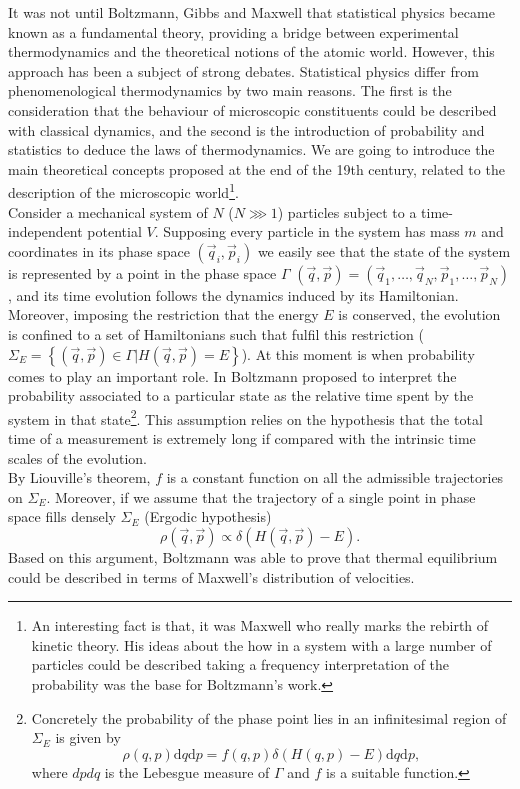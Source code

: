\indent It was not until Boltzmann, Gibbs and Maxwell that statistical physics became known as a fundamental theory, providing a bridge between experimental thermodynamics and the theoretical notions of the atomic world. However, this approach has been a subject of strong debates. Statistical physics differ from phenomenological thermodynamics by two main reasons. The first is the consideration that the behaviour of microscopic constituents could be described with classical dynamics, and the second is the introduction of probability and statistics to deduce the laws of thermodynamics. We are going to introduce the main theoretical concepts proposed at the end of the 19th century,  related to the description of the microscopic world\footnote{An interesting fact is that, it was Maxwell who really marks the rebirth of kinetic theory. His ideas about the how in a system with a large number of particles could be described taking a frequency interpretation of the probability was the base for Boltzmann's work.}.\\

\indent Consider a mechanical system of $N$ ($N \ggg 1$) particles subject to a time-independent potential $V$. Supposing every particle in the system has mass $m$ and coordinates in its phase space $(\vec{q}_i,\vec{p}_i)$ we easily see that the state of the system is represented by a point in the phase space $\Gamma$ $(\vec{q},\vec{p})=(\vec{q}_{1},\ldots,\vec{q}_{N},\vec{p}_{1},\ldots,\vec{p}_{N})$, and its time evolution follows the dynamics induced by its Hamiltonian. Moreover, imposing the restriction that the energy $E$ is conserved, the evolution is confined to a set of Hamiltonians such that fulfil this restriction ($\Sigma_{E}=\left\{(\vec{q},\vec{p})\in \Gamma | H(\vec{q},\vec{p})=E\right\}$). At this moment is when probability comes to play an important role. In \cite{boltzmann_uber_1866} Boltzmann proposed to interpret the probability associated to a particular state as the relative time spent by the system in that state\footnote{ Concretely the probability of the phase point lies in an infinitesimal region of $\Sigma_E$ is given by 
\[\rho(q, p) \mathrm{d} q \mathrm{d} p=f(q, p) \delta(H(q, p)-E) \mathrm{d} q \mathrm{d} p,\]
where $dpdq$ is the Lebesgue measure of $\Gamma$ and $f$ is a suitable function.}. This assumption relies on the hypothesis that the total time of a measurement is extremely long if compared with the intrinsic time scales of the evolution.\\

\indent By Liouville's theorem, $f$ is a constant function on all the admissible trajectories on $\Sigma_{E}$. Moreover, if we assume that the trajectory of a single point in phase space fills densely $\Sigma_E$ (Ergodic hypothesis)
\begin{equation}
\rho(\vec{q},\vec{p})\propto \delta(H(\vec{q},\vec{p})-E).
\label{CH1:Liouville_equation}
\end{equation}
\indent Based on this argument, Boltzmann was able to prove that thermal equilibrium could be described in terms of Maxwell's distribution of velocities.\\

